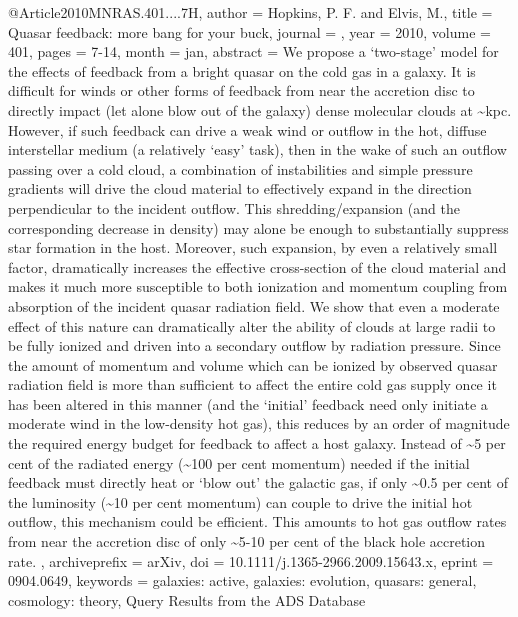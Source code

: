 \documentclass[longauth]{aa}
\begin{document}
{{{{{{{{{@Article{2010MNRAS.401....7H,
  author        = {Hopkins, P. F. and Elvis, M.},
  title         = {Quasar feedback: more bang for your buck},
  journal       = {\mnras},
  year          = {2010},
  volume        = {401},
  pages         = {7-14},
  month         = jan,
  abstract      = {We propose a `two-stage' model for the effects of feedback from a bright
quasar on the cold gas in a galaxy. It is difficult for winds or other
forms of feedback from near the accretion disc to directly impact (let
alone blow out of the galaxy) dense molecular clouds at \~{}kpc. However,
if such feedback can drive a weak wind or outflow in the hot, diffuse
interstellar medium (a relatively `easy' task), then in the wake of such
an outflow passing over a cold cloud, a combination of instabilities and
simple pressure gradients will drive the cloud material to effectively
expand in the direction perpendicular to the incident outflow. This
shredding/expansion (and the corresponding decrease in density) may
alone be enough to substantially suppress star formation in the host.
Moreover, such expansion, by even a relatively small factor,
dramatically increases the effective cross-section of the cloud material
and makes it much more susceptible to both ionization and momentum
coupling from absorption of the incident quasar radiation field. We show
that even a moderate effect of this nature can dramatically alter the
ability of clouds at large radii to be fully ionized and driven into a
secondary outflow by radiation pressure. Since the amount of momentum
and volume which can be ionized by observed quasar radiation field is
more than sufficient to affect the entire cold gas supply once it has
been altered in this manner (and the `initial' feedback need only
initiate a moderate wind in the low-density hot gas), this reduces by an
order of magnitude the required energy budget for feedback to affect a
host galaxy. Instead of \~{}5 per cent of the radiated energy (\~{}100 per
cent momentum) needed if the initial feedback must directly heat or
`blow out' the galactic gas, if only \~{}0.5 per cent of the luminosity
(\~{}10 per cent momentum) can couple to drive the initial hot outflow,
this mechanism could be efficient. This amounts to hot gas outflow rates
from near the accretion disc of only \~{}5-10 per cent of the black hole
accretion rate.
},
  archiveprefix = {arXiv},
  doi           = {10.1111/j.1365-2966.2009.15643.x},
  eprint        = {0904.0649},
  keywords      = {galaxies: active, galaxies: evolution, quasars: general, cosmology: theory},
}
Query Results from the ADS Database


}}}}}}}}}
\end{document}
